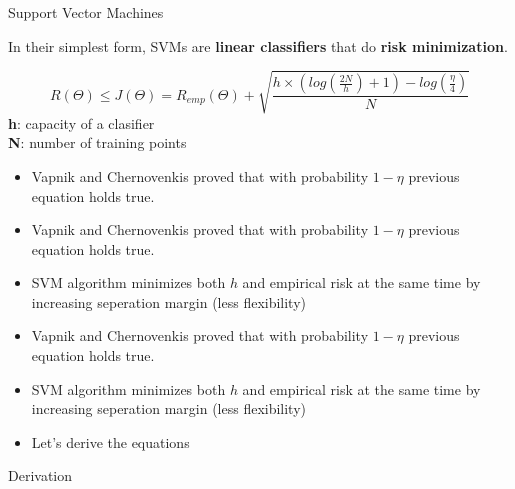 \documentclass[12pt,fleqn]{article}\usepackage{../common}
\begin{document}
Support Vector Machines

In their simplest form, SVMs are \textbf{linear classifiers} that do
\textbf{risk minimization}.

\begin{equation}
R(\Theta) \leq J(\Theta) = R_{emp}(\Theta) +
\sqrt{ \frac{h \times (log(\frac{2N}{h}) + 1) - log(\frac{\eta}{4})}{N}} \nonumber
\end{equation}
\textbf{h}: capacity of a clasifier \\
\textbf{N}: number of training points 

\begin{itemize}
   \item Vapnik and Chernovenkis proved that with probability $1-\eta$ previous
equation holds true.
\end{itemize}

\begin{itemize}
   \item Vapnik and Chernovenkis proved that with probability $1-\eta$ previous
equation holds true.
   \item SVM algorithm minimizes both $h$ and empirical risk at the same time by
   increasing seperation margin (less flexibility)
\end{itemize}

\begin{itemize}
   \item Vapnik and Chernovenkis proved that with probability $1-\eta$ previous
equation holds true.
   \item SVM algorithm minimizes both $h$ and empirical risk at the same time by
   increasing seperation margin (less flexibility)
   \item Let's derive the equations
\end{itemize}

Derivation

\begin{figure}[!hbp]
\caption{}
\end{figure}
\end{document}
